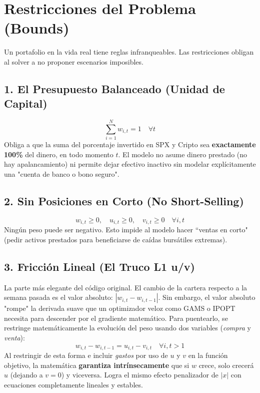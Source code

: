 \documentclass[11pt,a4paper]{article}
\begin{document}
\section{Restricciones del Problema (Bounds)}
Un portafolio en la vida real tiene reglas infranqueables. Las restricciones obligan al solver a no proponer escenarios imposibles.

\subsection{1. El Presupuesto Balanceado (Unidad de Capital)}
\begin{equation}
\sum_{i=1}^N w_{i,t} = 1 \quad \forall t
\end{equation}
Obliga a que la suma del porcentaje invertido en SPX y Cripto sea \textbf{exactamente 100\%} del dinero, en todo momento $t$. El modelo no asume dinero prestado (no hay apalancamiento) ni permite dejar efectivo inactivo sin modelar explícitamente una "cuenta de banco o bono seguro".

\subsection{2. Sin Posiciones en Corto (No Short-Selling)}
\begin{equation}
w_{i,t} \ge 0, \quad u_{i,t} \ge 0, \quad v_{i,t} \ge 0 \quad \forall i, t
\end{equation}
Ningún peso puede ser negativo. Esto impide al modelo hacer ``ventas en corto" (pedir activos prestados para beneficiarse de caídas bursátiles extremas).

\subsection{3. Fricción Lineal (El Truco L1 u/v)}
La parte más elegante del código original. El cambio de la cartera respecto a la semana pasada es el valor absoluto: $|w_{i,t} - w_{i,t-1}|$. Sin embargo, el valor absoluto "rompe" la derivada suave que un optimizador veloz como GAMS o IPOPT necesita para descender por el gradiente matemático. Para puentearlo, se restringe matemáticamente la evolución del peso usando dos variables (\textit{compra} y \textit{venta}):
\begin{equation}
w_{i,t} - w_{i,t-1} = u_{i,t} - v_{i,t} \quad \forall i, t>1
\end{equation}
Al restringir de esta forma e incluir \textit{gastos} por uso de $u$ y $v$ en la función objetivo, la matemática \textbf{garantiza intrínsecamente} que si $w$ crece, solo crecerá $u$ (dejando a $v=0$) y viceversa. Logra el mismo efecto penalizador de $|x|$ con ecuaciones completamente lineales y estables.
\end{document}
